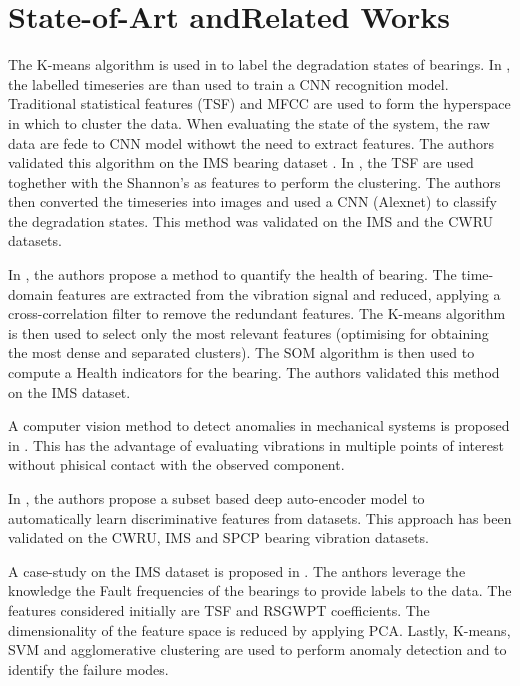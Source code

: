 \section{State-of-Art andRelated Works}
\label{sec:related_work}


The K-means algorithm is used in \cite{Zhou2019,Pinedo2020} to label the degradation states of bearings.  In \cite{Zhou2019}, the labelled timeseries are than used to train a CNN recognition model. Traditional statistical features (TSF) and MFCC are used to form the hyperspace in which to cluster the data. When evaluating the state of the system, the raw data are fede to CNN model withowt the need to extract features. The authors validated this algorithm on the IMS bearing dataset \cite{IMS_data}. In \cite{Pinedo2020}, the TSF are used toghether with the Shannon's as features to perform the clustering. The authors then converted the timeseries into images and used a CNN (Alexnet) to classify the degradation states. This method was validated on the IMS and the CWRU datasets.

In \cite{Chalouli2017}, the authors propose a method to quantify the health of bearing. The time-domain features are extracted from the vibration signal and reduced, applying a cross-correlation filter to remove the redundant features. The K-means algorithm is then used to select only the most relevant features (optimising for obtaining the most dense and separated clusters). The SOM algorithm is then used to compute a Health indicators for the bearing. The authors validated this method on the IMS dataset.

A  computer vision method to detect anomalies in mechanical systems is proposed in \cite{SPYTEK2023109823}. This has the advantage of evaluating vibrations in multiple points of interest without phisical contact with the observed component.

In \cite{ZHANG2018}, the authors propose a subset based deep auto-encoder model to automatically learn discriminative features from datasets. This approach has been validated on the CWRU, IMS and SPCP bearing vibration datasets.

A case-study on the IMS dataset is proposed in \cite{Gattino2023}. The anthors leverage the knowledge the Fault frequencies of the bearings to provide labels to the data. The features considered initially are TSF and RSGWPT coefficients. The dimensionality of the feature space is reduced by applying PCA. Lastly, K-means, SVM and agglomerative clustering are used to perform anomaly detection and to identify the failure modes.